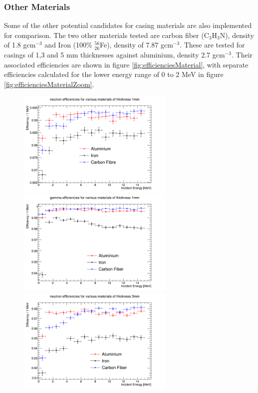 \subsubsection{Other Materials}
Some of the other potential candidates for casing materials are also implemented for comparison. The two other materials tested are carbon fiber (C$_{3}$H$_{3}$N), density of 1.8 gcm$^{-3}$ and Iron (100\% $^{56}_{26}$Fe), density of 7.87 gcm$^{-3}$. These are tested for casings of 1,3 and 5 mm thicknesses against aluminium, density 2.7 gcm$^{-3}$. Their associated efficiencies are shown in figure \ref{fig:efficienciesMaterial}, with separate efficiencies calculated for the lower energy range of 0 to 2 MeV in figure \ref{fig:efficienciesMaterialZoom}. 

\begin{figure}[htbp]
\begin{center}
\includegraphics[width=75mm]{Chapter6/figures/neutron1mmMaterialsEfficiency0-16MeV.png}
\includegraphics[width=75mm]{Chapter6/figures/gamma1mmMaterialsEfficiency0-16MeV.png}
\includegraphics[width=75mm]{Chapter6/figures/neutron3mmMaterialsEfficiency0-16MeV.png}

\end{center}
\end{figure}
